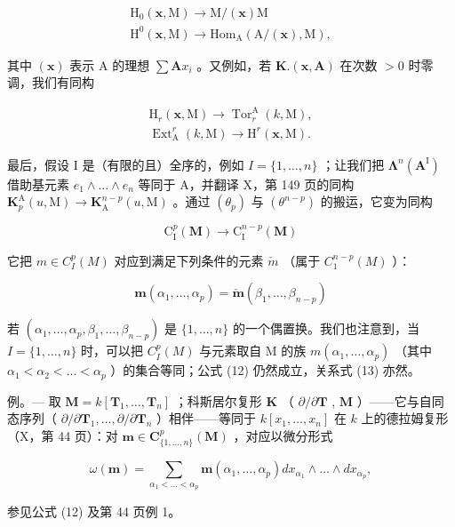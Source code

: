 \[
\begin{array}{l} \mathrm{H} _ {0} (\boldsymbol {x}, \mathrm{M}) \to \mathrm{M} / (\boldsymbol {x}) \mathrm{M} \\ \mathrm{H} ^ {0} (\boldsymbol {x}, \mathrm{M}) \to \mathrm{Hom} _ {\mathrm{A}} \left(\mathrm{A} / (\boldsymbol {x}), \mathrm{M}\right), \end{array}
\]

其中 \((\pmb{x})\) 表示 A 的理想 \(\sum \mathbf{A}x_{i}\) 。又例如，若 \(\mathbf{K}.(\pmb{x},\mathbf{A})\) 在次数 \(>0\) 时零调，我们有同构

\[
\begin{array}{l}\mathrm{H} _ {r} (\boldsymbol {x}, \mathrm{M}) \rightarrow \operatorname{Tor} _ {r} ^ {\mathrm{A}} (k, \mathrm{M}),\\\operatorname{Ext} _ {\mathrm{A}} ^ {r} (k, \mathrm{M}) \rightarrow \mathrm{H} ^ {r} (\boldsymbol {x}, \mathrm{M}).\end{array}
\]

最后，假设 I 是（有限的且）全序的，例如 \(I = \{1, \ldots, n\}\) ；让我们把 \(\symbf{\Lambda}^{n}(\mathbf{A}^{\mathrm{I}})\) 借助基元素 \(e_{1} \wedge \ldots \wedge e_{n}\) 等同于 A，并翻译 X，第 149 页的同构 \(\mathbf{K}_{p}^{\mathrm{A}}(u, \mathrm{M}) \to \mathbf{K}_{\mathrm{A}}^{n-p}(u, \mathrm{M})\) 。通过 \((\theta_{p})\) 与 \((\theta^{n-p})\) 的搬运，它变为同构

\[
\mathrm{C} _ {\mathrm{I}} ^ {p} (\mathbf {M}) \rightarrow \mathrm{C} _ {\mathrm{I}} ^ {n - p} (\mathbf {M})
\]

它把 \(m \in C_{I}^{p}(M)\) 对应到满足下列条件的元素 \(\check{m}\) （属于 \(C_{1}^{n-p}(M)\) ）：

\[
\boldsymbol {m} \left(\alpha_ {1}, \dots , \alpha_ {p}\right) = \check {\boldsymbol {m}} \left(\beta_ {1}, \dots , \beta_ {n - p}\right)\tag{13}
\]

若 \((\alpha_{1},\ldots,\alpha_{p},\beta_{1},\ldots,\beta_{n-p})\) 是 \(\{1,\ldots,n\}\) 的一个偶置换。我们也注意到，当 \(I=\{1,\ldots,n\}\) 时，可以把 \(C_{I}^{p}(M)\) 与元素取自 M 的族 \(m(\alpha_{1},\ldots,\alpha_{p})\) （其中 \(\alpha_{1}<\alpha_{2}<\ldots<\alpha_{p}\) ）的集合等同；公式 (12) 仍然成立，关系式 (13) 亦然。

例。--- 取 \(\mathbf{M} = k[\mathbf{T}_1, \ldots, \mathbf{T}_n]\) ；科斯居尔复形 \(\mathbf{K}\) （ \(\partial/\partial\mathbf{T}\) , \(\mathbf{M}\) ）——它与自同态序列（ \(\partial/\partial\mathbf{T}_1, \ldots, \partial/\partial\mathbf{T}_n\) ）相伴——等同于 \(k[x_{1},\ldots,x_{n}]\) 在 \(k\) 上的德拉姆复形（X，第 44 页）：对 \(\boldsymbol{m}\in\mathbf{C}_{\{1,\ldots,n\}}^{p}(\mathbf{M})\) ，对应以微分形式

\[
\omega (\boldsymbol {m}) = \sum_ {\alpha_ {1} <   \dots <   \alpha_ {p}} \boldsymbol {m} \left(\alpha_ {1}, \dots , \alpha_ {p}\right) d x _ {\alpha_ {1}} \wedge \dots \wedge d x _ {\alpha_ {p}},
\]

参见公式 (12) 及第 44 页例 1。


